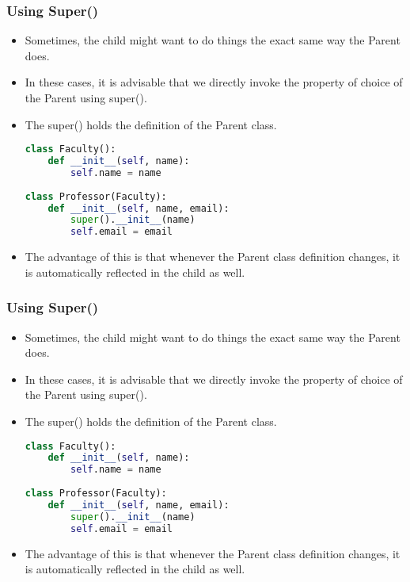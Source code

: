 \documentclass{beamer}
\begin{document}
\begin{frame}[fragile]
\frametitle{Using Super()}
\begin{itemize}
\item Sometimes, the child might want to do things the exact same way the Parent does. 
\item In these cases, it is advisable that we directly invoke the property of choice of the Parent using super().

\item The super() holds the definition of the Parent class.
\begin{lstlisting}[language=Python]
class Faculty():
    def __init__(self, name):
        self.name = name
    
class Professor(Faculty):
    def __init__(self, name, email):
        super().__init__(name)
        self.email = email        
\end{lstlisting}

\item The advantage of this is that whenever the Parent class definition changes, it is automatically reflected in the child as well.
\end{itemize}
\end{frame}

\begin{frame}[fragile]
\frametitle{Using Super()}
\begin{itemize}
\item Sometimes, the child might want to do things the exact same way the Parent does. 
\item In these cases, it is advisable that we directly invoke the property of choice of the Parent using super().

\item The super() holds the definition of the Parent class.
\begin{lstlisting}[language=Python]
class Faculty():
    def __init__(self, name):
        self.name = name
    
class Professor(Faculty):
    def __init__(self, name, email):
        super().__init__(name)
        self.email = email        
\end{lstlisting}

\item The advantage of this is that whenever the Parent class definition changes, it is automatically reflected in the child as well.
\end{itemize}
\end{frame}
\end{document}
